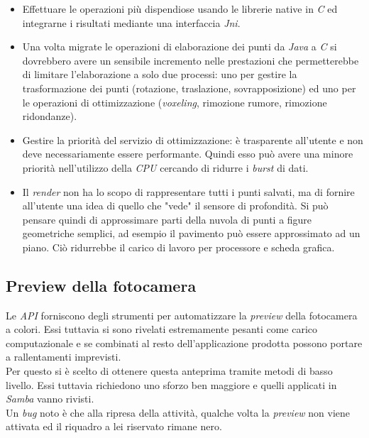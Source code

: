\begin{itemize}
	\item Effettuare le operazioni più dispendiose usando le librerie native in \emph{C} ed integrarne i risultati mediante una interfaccia \emph{Jni}.
	\item Una volta migrate le operazioni di elaborazione dei punti da \emph{Java} a \emph{C} si dovrebbero avere un sensibile incremento nelle prestazioni che permetterebbe di limitare l'elaborazione a solo due processi: uno per gestire la trasformazione dei punti (rotazione, traslazione, sovrapposizione) ed uno per le operazioni di ottimizzazione (\emph{voxeling}, rimozione rumore, rimozione ridondanze).
	\item Gestire la priorità del servizio di ottimizzazione: è trasparente all'utente e non deve necessariamente essere performante. Quindi esso può avere una minore priorità nell'utilizzo della \emph{CPU} cercando di ridurre i \emph{burst} di dati.
	\item Il \emph{render} non ha lo scopo di rappresentare tutti i punti salvati, ma di fornire all'utente una idea di quello che "vede" il sensore di profondità. Si può pensare quindi di approssimare parti della nuvola di punti a figure geometriche semplici, ad esempio il pavimento può essere approssimato ad un piano. Ciò ridurrebbe il carico di lavoro per processore e scheda grafica.
\end{itemize}
 

\subsection{Preview della fotocamera}
Le \emph{API} forniscono degli strumenti per automatizzare la \emph{preview} della fotocamera a colori. Essi tuttavia si sono rivelati estremamente pesanti come carico computazionale e se combinati al resto dell'applicazione prodotta possono portare a rallentamenti imprevisti.\\
Per questo si è scelto di ottenere questa anteprima tramite metodi di basso livello. Essi tuttavia richiedono uno sforzo ben maggiore e quelli applicati in \emph{Samba} vanno rivisti.\\
Un \emph{bug} noto è che alla ripresa della attività, qualche volta la \emph{preview} non viene attivata ed il riquadro a lei riservato rimane nero.


